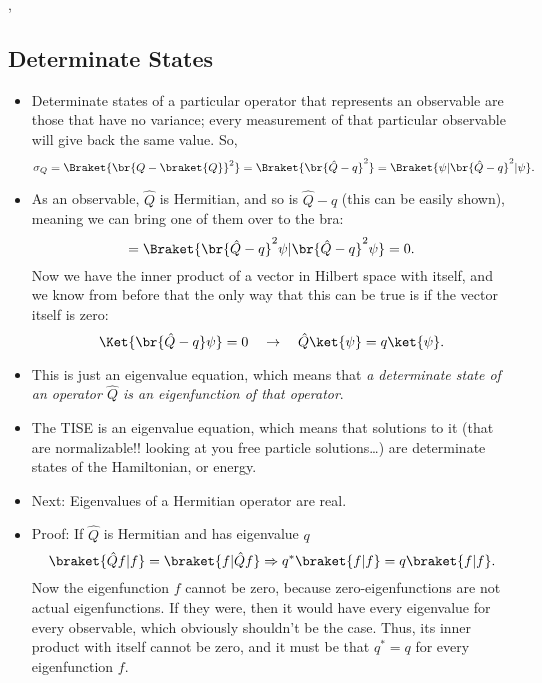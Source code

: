 \sep



\subsection*{Determinate States}

\begin{itemize}
    \item Determinate states of a particular operator that represents an observable are those that have no variance; every measurement of that particular observable will give back the same value. So,
        \begin{equation*}
            \sigma_Q = \Braket{\br{Q - \braket{Q}}^2} = \Braket{\br{\hat{Q} - q}^2} = \Braket{\psi | \br{\hat{Q} - q}^2 | \psi}.
        \end{equation*}
    \item As an observable, $\hat{Q}$ is Hermitian, and so is $\hat{Q} - q$ (this can be easily shown), meaning we can bring one of them over to the bra:
        \begin{equation*}
            = \Braket{\br{\hat{Q} - q}^2 \psi | \br{\hat{Q} - q}^2 \psi} = 0.
        \end{equation*}
        Now we have the inner product of a vector in Hilbert space with itself, and we know from before that the only way that this can be true is if the vector itself is zero:
        \begin{equation*}
            \Ket{\br{\hat{Q} - q}\psi} = 0 \quad \rightarrow \quad \hat{Q}\ket{\psi} = q\ket{\psi}.
        \end{equation*}
    \item This is just an eigenvalue equation, which means that \textit{a determinate state of an operator $\hat{Q}$ is an eigenfunction of that operator}.
    \item The TISE is an eigenvalue equation, which means that solutions to it (that are normalizable!! looking at you free particle solutions\ldots) are determinate states of the Hamiltonian, or energy.
    \item Next: Eigenvalues of a Hermitian operator are real.
    \item Proof: If $\hat{Q}$ is Hermitian and has eigenvalue $q$
        \begin{equation*}
            \braket{\hat{Q}f | f} = \braket{f | \hat{Q}f} \Rightarrow q^* \braket{f|f} = q\braket{f|f}.
        \end{equation*}
        Now the eigenfunction $f$ cannot be zero, because zero-eigenfunctions are not actual eigenfunctions. If they were, then it would have every eigenvalue for every observable, which obviously shouldn't be the case. Thus, its inner product with itself cannot be zero, and it must be that $q^* = q$ for every eigenfunction $f$.

\end{itemize}
